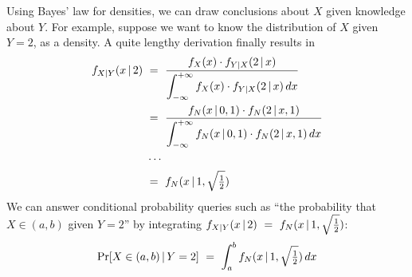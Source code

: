 Using Bayes' law for densities, we can draw conclusions about $X$ given knowledge about $Y$.
For example, suppose we want to know the distribution of $X$ given $Y = 2$, as a density.
A quite lengthy derivation finally results in
\begin{equation}
\begin{aligned}
	f_{X|Y}(x \given 2)&\ =\ \frac{f_{X}(x) \cdot f_{Y|X}(2 \given x)}{\displaystyle\int_{-\infty}^{+\infty} f_{X}(x) \cdot f_{Y|X}(2 \given x)\,dx}
\\
	&\ =\ \frac{f_N(x \given 0,1) \cdot f_N(2 \given x,1)}{\displaystyle\int_{-\infty}^{+\infty}
	f_N(x \given 0,1) \cdot f_N(2 \given x,1)\,dx}
\\
	&\,\,\cdots\ 
\\
	&\ =\ f_N(x \given 1, \sqrt{\tfrac{1}{2}})
\end{aligned}
\end{equation}
We can answer conditional probability queries such as ``the probability that $X \in (a,b)$ given $Y = 2$'' by integrating $f_{X|Y}(x \,|\, 2)\ =\ f_N(x \,|\, 1, \sqrt{\tfrac{1}{2}})$:
\begin{equation}
	\mathrm{Pr}\!\left[{X \in (a,b) \,|\, Y = 2}\right]\ =\ \int_a^b f_N(x \,|\, 1, \sqrt{\tfrac{1}{2}})\,dx
\end{equation}

